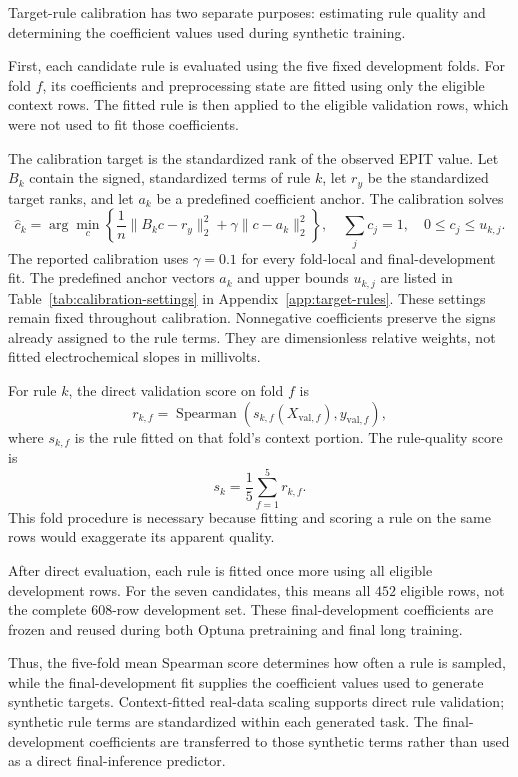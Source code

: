 \documentclass{article}
\begin{document}
Target-rule calibration has two separate purposes: estimating rule quality
and determining the coefficient values used during synthetic training.

First, each candidate rule is evaluated using the five fixed development
folds. For fold \(f\), its coefficients and preprocessing state are fitted
using only the eligible context rows. The fitted rule is then applied to the
eligible validation rows, which were not used to fit those coefficients.

The calibration target is the standardized rank of the observed EPIT value.
Let \(B_k\) contain the signed, standardized terms of rule \(k\), let
\(r_y\) be the standardized target ranks, and let \(a_k\) be a predefined
coefficient anchor. The calibration solves
\begin{equation}
\widehat c_k=\arg\min_{c}
\left\{
\frac{1}{n}\|B_kc-r_y\|_2^2+\gamma\|c-a_k\|_2^2
\right\},
\quad \sum_jc_j=1,\quad 0\leq c_j\leq u_{k,j}.
\label{eq:rule-calibration}
\end{equation}
The reported calibration uses \(\gamma=0.1\) for every fold-local and
final-development fit. The predefined anchor vectors \(a_k\) and upper bounds
\(u_{k,j}\) are listed in Table~\ref{tab:calibration-settings} in
Appendix~\ref{app:target-rules}. These settings remain fixed throughout
calibration. Nonnegative coefficients preserve the signs already assigned to
the rule terms. They are dimensionless relative weights, not fitted
electrochemical slopes in millivolts.

For rule \(k\), the direct validation score on fold \(f\) is
\[
r_{k,f}=\operatorname{Spearman}
\left(s_{k,f}(X_{\mathrm{val},f}),y_{\mathrm{val},f}\right),
\]
where \(s_{k,f}\) is the rule fitted on that fold's context portion. The
rule-quality score is
\begin{equation}
s_k=\frac{1}{5}\sum_{f=1}^{5}r_{k,f}.
\label{eq:rule-quality}
\end{equation}
This fold procedure is necessary because fitting and scoring a rule on the
same rows would exaggerate its apparent quality.

After direct evaluation, each rule is fitted once more using all eligible
development rows. For the seven candidates, this means all \(452\) eligible
rows, not the complete \(608\)-row development set. These final-development
coefficients are frozen and reused during both Optuna pretraining and final
long training.

Thus, the five-fold mean Spearman score determines how often a rule is sampled,
while the final-development fit supplies the coefficient values used to
generate synthetic targets. Context-fitted real-data scaling supports direct
rule validation; synthetic rule terms are standardized within each generated
task. The final-development coefficients are transferred to those synthetic
terms rather than used as a direct final-inference predictor.
\end{document}
